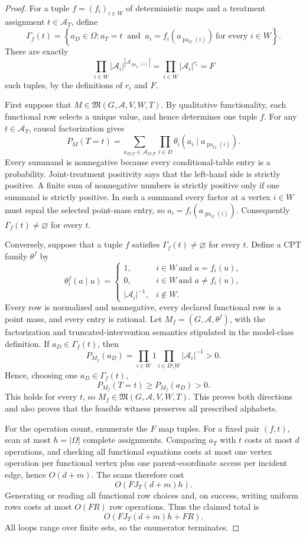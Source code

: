 \documentclass{article}
\begin{document}
\begin{proof}
For a tuple \(f=(f_i)_{i\in W}\) of deterministic maps and a treatment assignment \(t\in\mathcal A_T\), define
\[
 \Gamma_f(t)
 =\left\{a_D\in\Omega:
 a_T=t\ \text{ and }\
 a_i=f_i(a_{\operatorname{pa}_G(i)})\ \text{for every }i\in W
 \right\}.
\]
There are exactly
\[
 \prod_{i\in W}
 |\mathcal A_i|^{|\mathcal A_{\operatorname{pa}_G(i)}|}
 =\prod_{i\in W}|\mathcal A_i|^{r_i}=F
\]
such tuples, by the definitions of \(r_i\) and \(F\).

First suppose that \(M\in\mathfrak M(G,\mathcal A,V,W,T)\).  By qualitative functionality, each functional row selects a unique value, and hence determines one tuple \(f\).  For any \(t\in\mathcal A_T\), causal factorization gives
\[
 P_M(T=t)
 =\sum_{a_{D\setminus T}\in\mathcal A_{D\setminus T}}
   \prod_{i\in D}
   \theta_i(a_i\mid a_{\operatorname{pa}_G(i)}).
\]
Every summand is nonnegative because every conditional-table entry is a probability.  Joint-treatment positivity says that the left-hand side is strictly positive.  A finite sum of nonnegative numbers is strictly positive only if one summand is strictly positive.  In such a summand every factor at a vertex \(i\in W\) must equal the selected point-mass entry, so
\(a_i=f_i(a_{\operatorname{pa}_G(i)})\).  Consequently \(\Gamma_f(t)\ne\varnothing\) for every \(t\).

Conversely, suppose that a tuple \(f\) satisfies \(\Gamma_f(t)\ne\varnothing\) for every \(t\).  Define a CPT family \(\theta^f\) by
\[
 \theta^f_i(a\mid u)
 =\begin{cases}
  1, & i\in W\ \text{and }a=f_i(u),\\
  0, & i\in W\ \text{and }a\ne f_i(u),\\
  |\mathcal A_i|^{-1}, & i\notin W.
 \end{cases}
\]
Every row is normalized and nonnegative, every declared functional row is a point mass, and every entry is rational.  Let \(M_f=(G,\mathcal A,\theta^f)\), with the factorization and truncated-intervention semantics stipulated in the model-class definition.  If \(a_D\in\Gamma_f(t)\), then
\[
 P_{M_f}(a_D)
 =\prod_{i\in W}1
  \prod_{i\in D\setminus W}|\mathcal A_i|^{-1}
 >0.
\]
Hence, choosing one \(a_D\in\Gamma_f(t)\),
\[
 P_{M_f}(T=t)
 \ge P_{M_f}(a_D)>0.
\]
This holds for every \(t\), so \(M_f\in\mathfrak M(G,\mathcal A,V,W,T)\).  This proves both directions and also proves that the feasible witness preserves all prescribed alphabets.

For the operation count, enumerate the \(F\) map tuples.  For a fixed pair \((f,t)\), scan at most \(h=|\Omega|\) complete assignments.  Comparing \(a_T\) with \(t\) costs at most \(d\) operations, and checking all functional equations costs at most one vertex operation per functional vertex plus one parent-coordinate access per incident edge, hence \(O(d+m)\).  The scans therefore cost
\[
 O\!\left(FJ_T(d+m)h\right).
\]
Generating or reading all functional row choices and, on success, writing uniform rows costs at most \(O(FR)\) row operations.  Thus the claimed total is
\[
 O\!\left(FJ_T(d+m)h+FR\right).
\]
All loops range over finite sets, so the enumerator terminates.


\end{proof}
\end{document}
